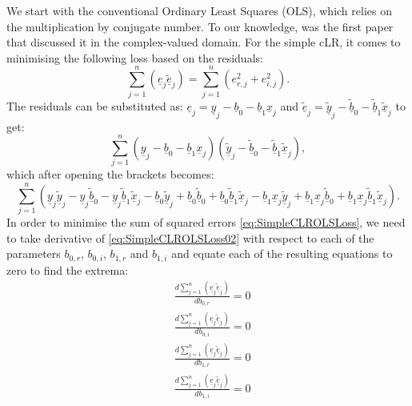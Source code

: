 \documentclass[
]{book}
\begin{document}
We start with the conventional Ordinary Least Squares (OLS), which relies on the multiplication by conjugate number. To our knowledge, \citet{VandenBos1994} was the first paper that discussed it in the complex-valued domain. For the simple cLR, it comes to minimising the following loss based on the residuals:
\begin{equation}
    \sum_{j=1}^n (\underline{e}_j \underline{\tilde{e}}_j) = \sum_{j=1}^n (e_{r,j}^2 + e_{i,j}^2).
    \label{eq:SimpleCLROLSLoss}
\end{equation}
The residuals can be substituted as: \(\underline{e}_j = \underline{y}_j - \underline{b}_0 - \underline{b}_1 \underline{x}_j\) and \(\underline{\tilde{e}}_j = \underline{\tilde{y}}_j - \underline{\tilde{b}}_0 - \underline{\tilde{b}}_1 \underline{\tilde{x}}_j\) to get:
\begin{equation}
    \sum_{j=1}^n (\underline{y}_j - \underline{b}_0 - \underline{b}_1 \underline{x}_j) (\underline{\tilde{y}}_j - \underline{\tilde{b}}_0 - \underline{\tilde{b}}_1 \underline{\tilde{x}}_j),
    \label{eq:SimpleCLROLSLoss01}
\end{equation}
which after opening the brackets becomes:
\begin{equation}
    \sum_{j=1}^n \left(\underline{y}_j \underline{\tilde{y}}_j - \underline{y}_j \underline{\tilde{b}}_0 - \underline{y}_j \underline{\tilde{b}}_1 \underline{\tilde{x}}_j - \underline{b}_0\underline{\tilde{y}}_j + \underline{b}_0 \underline{\tilde{b}}_0 + \underline{b}_0 \underline{\tilde{b}}_1 \underline{\tilde{x}}_j - \underline{b}_1 \underline{x}_j \underline{\tilde{y}}_j + \underline{b}_1 \underline{x}_j \underline{\tilde{b}}_0 + \underline{b}_1 \underline{x}_j \underline{\tilde{b}}_1 \underline{\tilde{x}}_j \right) .
    \label{eq:SimpleCLROLSLoss02}
\end{equation}
In order to minimise the sum of squared errors \eqref{eq:SimpleCLROLSLoss}, we need to take derivative of \eqref{eq:SimpleCLROLSLoss02} with respect to each of the parameters \(b_{0,r}\), \(b_{0,i}\), \(b_{1,r}\) and \(b_{1,i}\) and equate each of the resulting equations to zero to find the extrema:
\begin{equation}
    \begin{aligned}
        & \frac{d \sum_{j=1}^n (\underline{e}_j \underline{\tilde{e}}_j)}{d b_{0,r}} = 0 \\
        & \frac{d \sum_{j=1}^n (\underline{e}_j \underline{\tilde{e}}_j)}{d b_{0,i}} = 0 \\
        & \frac{d \sum_{j=1}^n (\underline{e}_j \underline{\tilde{e}}_j)}{d b_{1,r}} = 0 \\
        & \frac{d \sum_{j=1}^n (\underline{e}_j \underline{\tilde{e}}_j)}{d b_{1,i}} = 0
    \end{aligned}
    \label{eq:SimpleCLROLSLossSystem01}
\end{equation}
\end{document}
